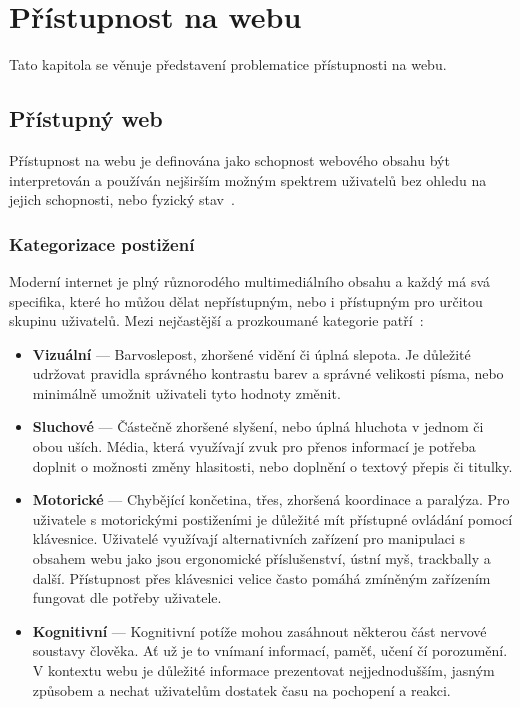 \chapter{Přístupnost na webu}

Tato kapitola se věnuje představení problematice přístupnosti na webu.

\section{Přístupný web}

Přístupnost na webu je definována jako schopnost webového obsahu být interpretován a používán nejširším možným spektrem uživatelů bez ohledu na jejich schopnosti, nebo fyzický stav~\cite{w3-accessibility}.

\subsection{Kategorizace postižení}

Moderní internet je plný různorodého multimediálního obsahu a každý má svá specifika, které ho můžou dělat nepřístupným, nebo i přístupným pro určitou skupinu uživatelů.
Mezi nejčastější a prozkoumané kategorie patří~\cite{w3-disabilities}:

\begin{itemize}
    \item \textbf{Vizuální} --- Barvoslepost, zhoršené vidění či úplná slepota.
          Je důležité udržovat pravidla správného kontrastu barev a správné velikosti písma, nebo minimálně umožnit uživateli tyto hodnoty změnit.
    \item \textbf{Sluchové} --- Částečně zhoršené slyšení, nebo úplná hluchota v jednom či obou uších.
          Média, která využívají zvuk pro přenos informací je potřeba doplnit o možnosti změny hlasitosti, nebo doplnění o textový přepis či titulky.
    \item \textbf{Motorické} --- Chybějící končetina, třes, zhoršená koordinace a paralýza.
          Pro uživatele s motorickými postiženími je důležité mít přístupné ovládání pomocí klávesnice.
          Uživatelé využívají alternativních zařízení pro manipulaci s obsahem webu jako jsou ergonomické příslušenství, ústní myš, trackbally a další.
          Přístupnost přes klávesnici velice často pomáhá zmíněným zařízením fungovat dle potřeby uživatele.
    \item \textbf{Kognitivní} --- Kognitivní potíže mohou zasáhnout některou část nervové soustavy člověka.
          Ať už je to vnímaní informací, paměť, učení čí porozumění.
          V kontextu webu je důležité informace prezentovat nejjednodušším, jasným způsobem a nechat uživatelům dostatek času na pochopení a reakci.
\end{itemize}

